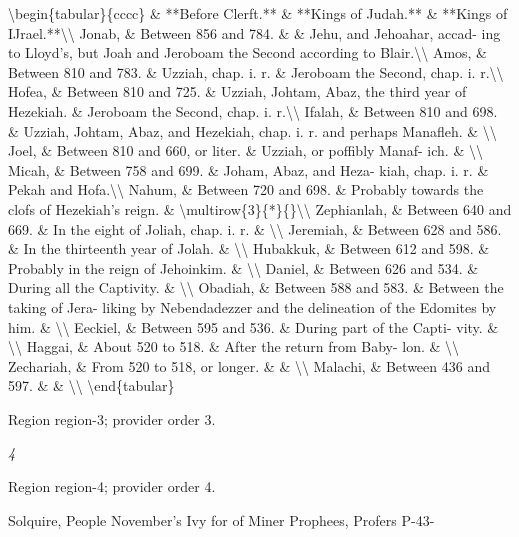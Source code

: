 \documentclass[11pt]{article}
\begin{document}
\textbackslash{}begin\{tabular\}\{cccc\}
 \& **Before Clerft.** \& **Kings of Judah.** \& **Kings of IJrael.**\textbackslash{}\textbackslash{}
Jonab, \& Between 856 and 784. \& \& Jehu, and Jehoahar, accad- ing to Lloyd's, but Joah and Jeroboam the Second according to Blair.\textbackslash{}\textbackslash{}
Amos, \& Between 810 and 783. \& Uzziah, chap. i. r. \& Jeroboam the Second, chap. i. r.\textbackslash{}\textbackslash{}
Hofea, \& Between 810 and 725. \& Uzziah, Johtam, Abaz, the third year of Hezekiah. \& Jeroboam the Second, chap. i. r.\textbackslash{}\textbackslash{}
Ifalah, \& Between 810 and 698. \& Uzziah, Johtam, Abaz, and Hezekiah, chap. i. r. and perhaps Manafleh. \& \textbackslash{}\textbackslash{}
Joel, \& Between 810 and 660, or liter. \& Uzziah, or poffibly Manaf- ich. \& \textbackslash{}\textbackslash{}
Micah, \& Between 758 and 699. \& Joham, Abaz, and Heza- kiah, chap. i. r. \& Pekah and Hofa.\textbackslash{}\textbackslash{}
Nahum, \& Between 720 and 698. \& Probably towards the clofs of Hezekiah's reign. \& \textbackslash{}multirow\{3\}\{*\}\{\}\textbackslash{}\textbackslash{}
Zephianlah, \& Between 640 and 669. \& In the eight of Joliah, chap. i. r. \& \textbackslash{}\textbackslash{}
Jeremiah, \& Between 628 and 586. \& In the thirteenth year of Jolah. \& \textbackslash{}\textbackslash{}
Hubakkuk, \& Between 612 and 598. \& Probably in the reign of Jehoinkim. \& \textbackslash{}\textbackslash{}
Daniel, \& Between 626 and 534. \& During all the Captivity. \& \textbackslash{}\textbackslash{}
Obadiah, \& Between 588 and 583. \& Between the taking of Jera- liking by Nebendadezzer and the delineation of the Edomites by him. \& \textbackslash{}\textbackslash{}
Eeckiel, \& Between 595 and 536. \& During part of the Capti- vity. \& \textbackslash{}\textbackslash{}
Haggai, \& About 520 to 518. \& After the return from Baby- lon. \& \textbackslash{}\textbackslash{}
Zechariah, \& From 520 to 518, or longer. \& \& \textbackslash{}\textbackslash{}
Malachi, \& Between 436 and 597. \& \& \textbackslash{}\textbackslash{}
\textbackslash{}end\{tabular\}
\par

{\scriptsize\color{gray} Region region-3; provider order 3.\par}
\medskip

{\small\itshape 4\par}

{\scriptsize\color{gray} Region region-4; provider order 4.\par}
\medskip

Solquire,
People
November’s
Ivy for of
Miner
Prophees,
Profers
P-43-
\par
\end{document}
